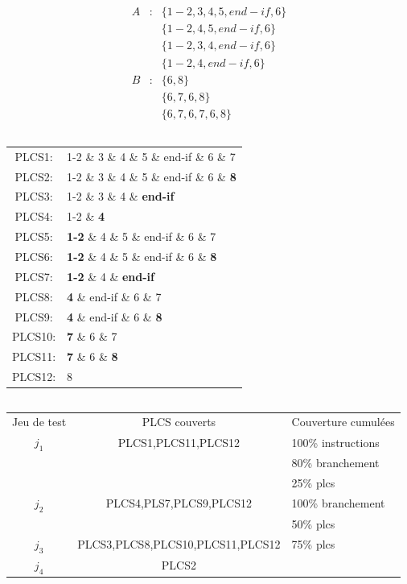 \documentclass[12pt,a4paper,openany]{book}
\begin{document}
	\subsection{}
	\begin{eqnarray*}
		A&:& \{1-2,3,4,5,end-if,6\}\\
	&&\{1-2,4,5,end-if,6\}\\
	&&\{1-2,3,4,end-if,6\}\\
	&&\{1-2,4,end-if,6\}\\
	B&:&\{6,8\}\\
	&&\{6,7,6,8\}\\
	&&\{6,7,6,7,6,8\}
	\end{eqnarray*}

	\subsection{}
	\begin{tabular}{cl}
		PLCS1: & 1-2 \& 3 \& 4 \& 5 \& end-if \& 6 \& 7 \\
		PLCS2: & 1-2 \& 3 \& 4 \& 5 \& end-if \& 6 \& \textbf{8 }\\
		PLCS3: & 1-2 \& 3 \& 4 \& \textbf{end-if }\\
		PLCS4: & 1-2 \& \textbf{4 }\\ 
		PLCS5: & \textbf{1-2 }\& 4 \& 5 \& end-if \& 6 \& 7\\
		PLCS6: & \textbf{1-2 }\& 4 \& 5 \& end-if \& 6 \& \textbf{8 }\\
		PLCS7: & \textbf{1-2 }\& 4 \& \textbf{end-if }\\
		PLCS8: & \textbf{4 }\& end-if \& 6 \& 7 \\
		PLCS9: & \textbf{4 }\& end-if \& 6 \& \textbf{8 }\\
		PLCS10: & \textbf{7 }\& 6 \& 7 \\
		PLCS11: & \textbf{7 }\& 6 \& \textbf{8 }\\
		PLCS12: & 8 \\ 
	\end{tabular}

	\subsection{}
	\begin{tabular}{ccl}
		Jeu de test & PLCS couverts & Couverture cumulées\\
		$j_1$ & PLCS1,PLCS11,PLCS12  & 100\% instructions\\
		&& 80\% branchement\\
		&& 25\% plcs\\
		$j_2$ & PLCS4,PLS7,PLCS9,PLCS12  & 100\%  branchement\\
		&& 50\% plcs\\
		$j_3$ & PLCS3,PLCS8,PLCS10,PLCS11,PLCS12  & 75\% plcs\\
		$j_4$ & PLCS2  & \\

	\end{tabular}
\end{document}
